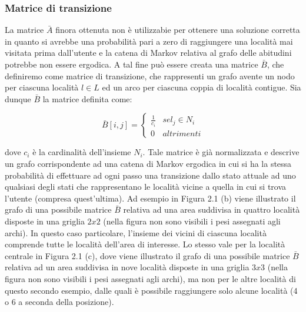 \subsubsection{Matrice di transizione}
La matrice $\bar{A}$ finora ottenuta non \`e utilizzabie per ottenere una soluzione
corretta in quanto si avrebbe una probabilit\`a pari a zero di raggiungere una localit\`a mai visitata
prima dall'utente e la catena di Markov relativa al grafo delle abitudini potrebbe
non essere ergodica. A tal fine pu\`o essere creata una matrice $\bar{B}$,
che definiremo come matrice di transizione, che rappresenti un grafo avente
un nodo per ciascuna localit\`a $l \in L$ ed un arco per ciascuna coppia di localit\`a
contigue. Sia dunque $\bar{B}$ la matrice definita come:

\begin{equation}
\bar{B}[i,j] =
\left\{\begin{matrix}
\frac{1}{c_{i}} & se l_{j} \in N_{i}\\
0 & altrimenti
\end{matrix}\right.
\end{equation}

dove $c_{i}$ \`e la cardinalit\`a dell'insieme $N_{i}$. Tale matrice \`e gi\`a normalizzata e
descrive un grafo corrispondente ad una catena di Markov ergodica in cui si
ha la stessa probabilit\`a di effettuare ad ogni passo una transizione dallo stato
attuale ad uno qualsiasi degli stati che rappresentano le localit\`a vicine a quella
in cui si trova l'utente (compresa quest'ultima).
Ad esempio in Figura 2.1 (b) viene illustrato il grafo di una possibile matrice
$\bar{B}$ relativa ad una area suddivisa in quattro localit\`a disposte in una griglia
$2 x 2$ (nella figura non sono visibili i pesi assegnati agli archi). In questo caso
particolare, l'insieme dei vicini di ciascuna localit\`a comprende tutte le localit\`a
dell'area di interesse. Lo stesso vale per la localit\`a centrale in Figura 2.1 (c),
dove viene illustrato il grafo di una possibile matrice $\bar{B}$ relativa ad un area
suddivisa in nove localit\`a disposte in una griglia $3 x 3$ (nella figura non sono
visibili i pesi assegnati agli archi), ma non per le altre localit\`a di questo secondo
esempio, dalle quali \`e possibile raggiungere solo alcune localit\`a (4 o 6 a seconda
della posizione).

